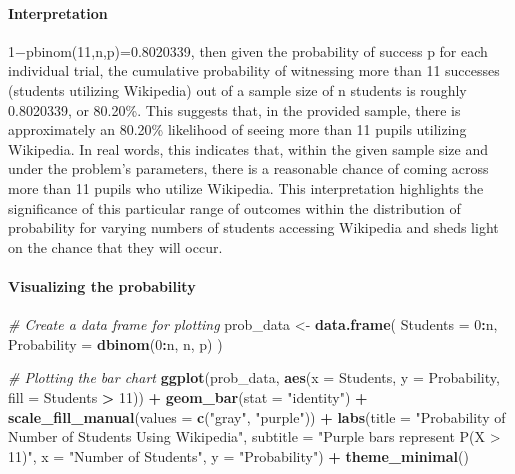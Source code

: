 \documentclass[
]{article}
\newenvironment{Shaded}{\begin{snugshade}}{\end{snugshade}}
\newcommand{\AttributeTok}[1]{\textcolor[rgb]{0.13,0.29,0.53}{#1}}
\newcommand{\CommentTok}[1]{\textcolor[rgb]{0.56,0.35,0.01}{\textit{#1}}}
\newcommand{\DecValTok}[1]{\textcolor[rgb]{0.00,0.00,0.81}{#1}}
\newcommand{\FunctionTok}[1]{\textcolor[rgb]{0.13,0.29,0.53}{\textbf{#1}}}
\newcommand{\NormalTok}[1]{#1}
\newcommand{\OtherTok}[1]{\textcolor[rgb]{0.56,0.35,0.01}{#1}}
\newcommand{\SpecialCharTok}[1]{\textcolor[rgb]{0.81,0.36,0.00}{\textbf{#1}}}
\newcommand{\StringTok}[1]{\textcolor[rgb]{0.31,0.60,0.02}{#1}}
\begin{document}
\paragraph{Interpretation}\label{interpretation-6}

1−pbinom(11,n,p)=0.8020339, then given the probability of success p for
each individual trial, the cumulative probability of witnessing more
than 11 successes (students utilizing Wikipedia) out of a sample size of
n students is roughly 0.8020339, or 80.20\%. This suggests that, in the
provided sample, there is approximately an 80.20\% likelihood of seeing
more than 11 pupils utilizing Wikipedia. In real words, this indicates
that, within the given sample size and under the problem's parameters,
there is a reasonable chance of coming across more than 11 pupils who
utilize Wikipedia. This interpretation highlights the significance of
this particular range of outcomes within the distribution of probability
for varying numbers of students accessing Wikipedia and sheds light on
the chance that they will occur.

\paragraph{Visualizing the
probability}\label{visualizing-the-probability-2}

\begin{Shaded}
\begin{Highlighting}[]
\CommentTok{\# Create a data frame for plotting}
\NormalTok{prob\_data }\OtherTok{\textless{}{-}} \FunctionTok{data.frame}\NormalTok{(}
  \AttributeTok{Students =} \DecValTok{0}\SpecialCharTok{:}\NormalTok{n,}
  \AttributeTok{Probability =} \FunctionTok{dbinom}\NormalTok{(}\DecValTok{0}\SpecialCharTok{:}\NormalTok{n, n, p)}
\NormalTok{)}

\CommentTok{\# Plotting the bar chart}
\FunctionTok{ggplot}\NormalTok{(prob\_data, }\FunctionTok{aes}\NormalTok{(}\AttributeTok{x =}\NormalTok{ Students, }\AttributeTok{y =}\NormalTok{ Probability, }\AttributeTok{fill =}\NormalTok{ Students }\SpecialCharTok{\textgreater{}} \DecValTok{11}\NormalTok{)) }\SpecialCharTok{+}
  \FunctionTok{geom\_bar}\NormalTok{(}\AttributeTok{stat =} \StringTok{"identity"}\NormalTok{) }\SpecialCharTok{+}
  \FunctionTok{scale\_fill\_manual}\NormalTok{(}\AttributeTok{values =} \FunctionTok{c}\NormalTok{(}\StringTok{"gray"}\NormalTok{, }\StringTok{"purple"}\NormalTok{)) }\SpecialCharTok{+}
  \FunctionTok{labs}\NormalTok{(}\AttributeTok{title =} \StringTok{"Probability of Number of Students Using Wikipedia"}\NormalTok{,}
       \AttributeTok{subtitle =} \StringTok{"Purple bars represent P(X \textgreater{} 11)"}\NormalTok{,}
       \AttributeTok{x =} \StringTok{"Number of Students"}\NormalTok{,}
       \AttributeTok{y =} \StringTok{"Probability"}\NormalTok{) }\SpecialCharTok{+}
  \FunctionTok{theme\_minimal}\NormalTok{()}
\end{Highlighting}
\end{Shaded}
\end{document}
